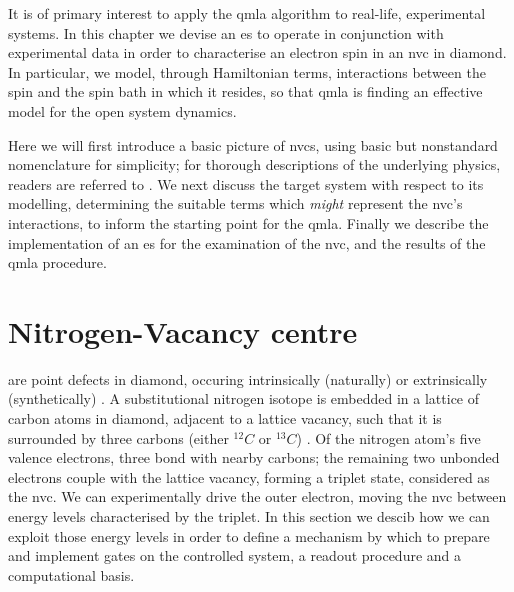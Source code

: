 \glsresetall
It is of primary interest to apply the \gls{qmla} algorithm to real-life, experimental systems. 
In this chapter we devise an \gls{es} to operate in conjunction with experimental data 
    in order to characterise an electron spin in an \gls{nvc} in diamond.
In particular, we model, through Hamiltonian terms, interactions between the spin and 
    the spin bath in which it resides,
    so that \gls{qmla} is finding an effective model for the open system dynamics.
\par

Here we will first introduce a basic picture of \glspl{nvc}, 
    using basic but nonstandard nomenclature for simplicity;
    for thorough descriptions of the underlying physics, readers are referred to \cite{doherty2013nitrogen}.
We next discuss the target system with respect to its modelling, 
    determining the suitable terms which \emph{might} represent the \gls{nvc}'s interactions, 
    to inform the starting point for the \gls{qmla}.
Finally we describe the implementation of an \gls{es} for the examination of the \gls{nvc},
    and the results of the \gls{qmla} procedure. 

\section{Nitrogen-Vacancy centre}
\label{sec:nv_centres}

 are point defects in diamond, 
    occuring intrinsically (naturally) \cite{davies1976optical} or extrinsically (synthetically) \cite{meijer2005generation, edmonds2012production}.
A substitutional \gls{nitrogen} isotope is embedded in a lattice of carbon atoms in diamond, 
    adjacent to a lattice vacancy, 
    such that it is surrounded by three \glspl{carbon} (either $^{12}C$ or $^{13}C$) \cite{lenef1996electronic}. 
Of the \gls{nitrogen} atom's five valence electrons, three bond with nearby \glspl{carbon};
    the remaining two unbonded electrons couple with the lattice vacancy, 
    forming a triplet state, considered as the \gls{nvc}. 
We can experimentally drive the outer electron, moving the \gls{nvc} between energy levels characterised by the triplet. 
In this section we descib how we can exploit those energy levels in order to define a mechanism by which to 
    prepare and implement gates on the controlled system, a readout procedure and a computational basis.

\par 

